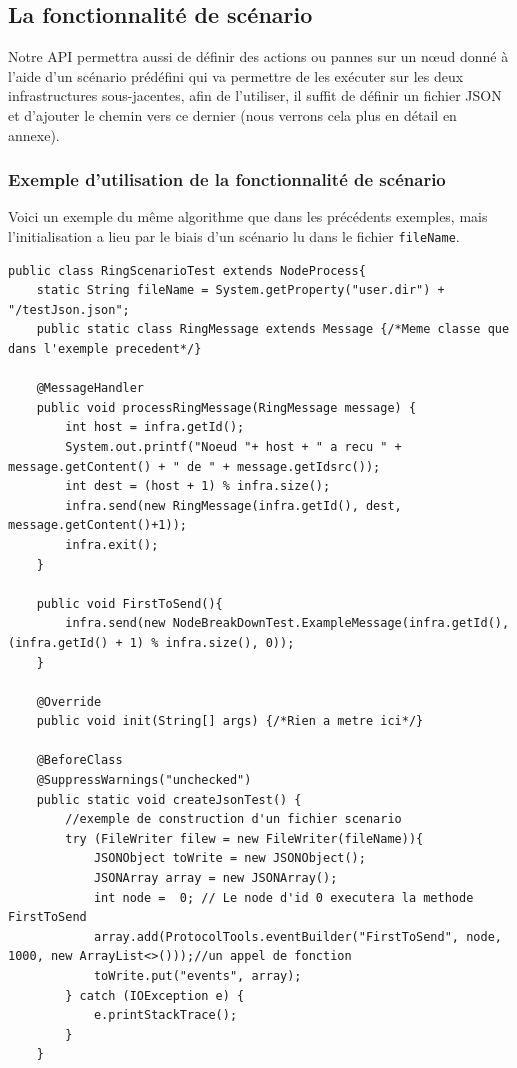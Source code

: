 \documentclass{article}
\begin{document}
					\subsection{La fonctionnalité de scénario}
					Notre API permettra aussi de définir des actions ou pannes sur un nœud donné à l'aide d'un scénario prédéfini qui va permettre de les exécuter sur les deux infrastructures sous-jacentes,
					afin de l'utiliser, il suffit de définir un fichier JSON et d'ajouter le chemin vers ce dernier (nous verrons cela plus en détail en annexe).
					\newpage
					\subsubsection{Exemple d'utilisation de la fonctionnalité de scénario}
				Voici un exemple du même algorithme que dans les précédents exemples,  mais l'initialisation a lieu par le biais d'un scénario lu dans le fichier \verb|fileName|.
				\begin{lstlisting}
public class RingScenarioTest extends NodeProcess{
    static String fileName = System.getProperty("user.dir") + "/testJson.json";
    public static class RingMessage extends Message {/*Meme classe que dans l'exemple precedent*/}

    @MessageHandler
    public void processRingMessage(RingMessage message) {
        int host = infra.getId();
        System.out.printf("Noeud "+ host + " a recu " + message.getContent() + " de " + message.getIdsrc());
        int dest = (host + 1) % infra.size();
        infra.send(new RingMessage(infra.getId(), dest, message.getContent()+1));
        infra.exit();
    }

    public void FirstToSend(){
        infra.send(new NodeBreakDownTest.ExampleMessage(infra.getId(),(infra.getId() + 1) % infra.size(), 0));
    }

    @Override
	public void init(String[] args) {/*Rien a metre ici*/}
	
    @BeforeClass
    @SuppressWarnings("unchecked")
    public static void createJsonTest() {
		//exemple de construction d'un fichier scenario
        try (FileWriter filew = new FileWriter(fileName)){
            JSONObject toWrite = new JSONObject();
            JSONArray array = new JSONArray();
            int node =  0; // Le node d'id 0 executera la methode FirstToSend
            array.add(ProtocolTools.eventBuilder("FirstToSend", node, 1000, new ArrayList<>()));//un appel de fonction
            toWrite.put("events", array);
        } catch (IOException e) {
            e.printStackTrace();
        }
    }
				\end{lstlisting}
				\newpage
					
\end{document}
